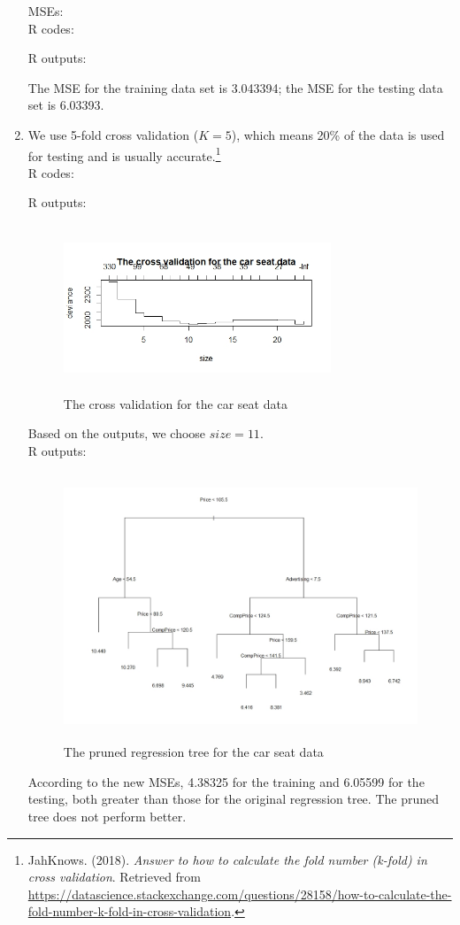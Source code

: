 \documentclass[10pt]{article}
\begin{document}
\begin{enumerate}[1)]
MSEs:\\
R codes:

R outputs:

The MSE for the training data set is 3.043394; the MSE for the testing data set is 6.03393.
\vspace{3mm}

\item
We use 5-fold cross validation ($K=5$), which means 20\% of the data is used for testing and is usually accurate.\footnote{ JahKnows. (2018). \textit{Answer to how to calculate the fold number (k-fold) in cross validation}. Retrieved from \url{https://datascience.stackexchange.com/questions/28158/how-to-calculate-the-fold-number-k-fold-in-cross-validation}.}\\
R codes:

R outputs:

\begin{figure}[H]
  \centering
  \includegraphics[width=8cm,height=5cm]{p12a.jpeg}
  \caption{The cross validation for the car seat data}
\end{figure}
Based on the outputs, we choose $size=11$.\\
R outputs:
\begin{figure}[H]
  \centering
  \includegraphics[width=12cm,height=8cm]{p12b.jpeg}
  \caption{The pruned regression tree for the car seat data}
\end{figure}

According to the new MSEs, 4.38325 for the training and 6.05599 for the testing, both greater than those for the original regression tree. The pruned tree does not perform better.
\vspace{3mm}


\end{enumerate}
\end{document}
